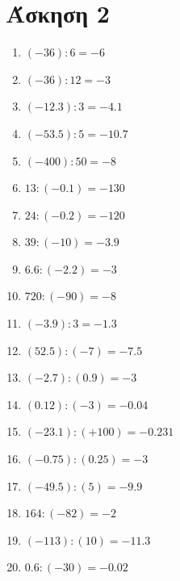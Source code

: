 \documentclass[a4paper,10pt]{report}
\begin{document}
\section*{Άσκηση 2  \hfill \small{}}
\begin{enumerate}[1)]
 \item $(-36):6=-6$
 \item $(-36):12=-3$
 \item $(-12.3):3=-4.1$
 \item $(-53.5):5=-10.7$
 \item $(-400):50=-8$
 \item $13:(-0.1)=-130$
 \item $24:(-0.2)=-120$
 \item $39:(-10)=-3.9$
 \item $6.6:(-2.2)=-3$
 \item $720:(-90)=-8$
 \item $(-3.9):3=-1.3$
 \item $(52.5):(-7)=-7.5$
 \item $(-2.7):(0.9)=-3$
 \item $(0.12):(-3)=-0.04$
 \item $(-23.1):(+100)=-0.231$
 \item $(-0.75):(0.25)=-3$
 \item $(-49.5):(5)=-9.9$
 \item $164:(-82)=-2$
 \item $(-113):(10)=-11.3$
 \item $0.6:(-30)=-0.02$
\end{enumerate}
\end{document}

